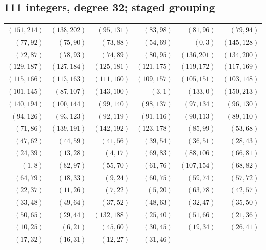 \subsection*{111 integers, degree 32; staged grouping}
\begingroup\small
\begin{longtable}{rrrrrr}
$(151,214)$ & $(138,202)$ & $(95,131)$ & $(83,98)$ & $(81,96)$ & $(79,94)$\\
$(77,92)$ & $(75,90)$ & $(73,88)$ & $(54,69)$ & $(0,3)$ & $(145,128)$\\
$(72,87)$ & $(78,93)$ & $(74,89)$ & $(80,95)$ & $(136,201)$ & $(134,200)$\\
$(129,187)$ & $(127,184)$ & $(125,181)$ & $(121,175)$ & $(119,172)$ & $(117,169)$\\
$(115,166)$ & $(113,163)$ & $(111,160)$ & $(109,157)$ & $(105,151)$ & $(103,148)$\\
$(101,145)$ & $(87,107)$ & $(143,100)$ & $(3,1)$ & $(133,0)$ & $(150,213)$\\
$(140,194)$ & $(100,144)$ & $(99,140)$ & $(98,137)$ & $(97,134)$ & $(96,130)$\\
$(94,126)$ & $(93,123)$ & $(92,119)$ & $(91,116)$ & $(90,113)$ & $(89,110)$\\
$(71,86)$ & $(139,191)$ & $(142,192)$ & $(123,178)$ & $(85,99)$ & $(53,68)$\\
$(47,62)$ & $(44,59)$ & $(41,56)$ & $(39,54)$ & $(36,51)$ & $(28,43)$\\
$(24,39)$ & $(13,28)$ & $(4,17)$ & $(69,83)$ & $(88,106)$ & $(66,81)$\\
$(1,8)$ & $(82,97)$ & $(55,70)$ & $(61,76)$ & $(107,154)$ & $(68,82)$\\
$(64,79)$ & $(18,33)$ & $(9,24)$ & $(60,75)$ & $(59,74)$ & $(57,72)$\\
$(22,37)$ & $(11,26)$ & $(7,22)$ & $(5,20)$ & $(63,78)$ & $(42,57)$\\
$(33,48)$ & $(49,64)$ & $(37,52)$ & $(48,63)$ & $(32,47)$ & $(35,50)$\\
$(50,65)$ & $(29,44)$ & $(132,188)$ & $(25,40)$ & $(51,66)$ & $(21,36)$\\
$(10,25)$ & $(6,21)$ & $(45,60)$ & $(30,45)$ & $(19,34)$ & $(26,41)$\\
$(17,32)$ & $(16,31)$ & $(12,27)$ & $(31,46)$ & &\\
\end{longtable}
\endgroup
